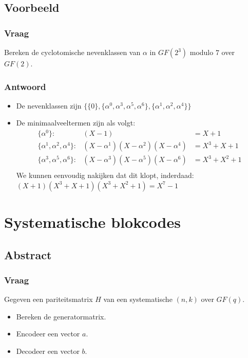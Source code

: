 \documentclass[main.tex]{subfiles}
\begin{document}
\subsection*{Voorbeeld}
\subsubsection*{Vraag}
Bereken de cyclotomische nevenklassen van $\alpha$ in $GF(2^{3})$ modulo $7$ over $GF(2)$.
\subsubsection*{Antwoord}
\begin{itemize}
\item De nevenklassen zijn $\{ \{0\}, \{\alpha^{0}, \alpha^{3}, \alpha^{5}, \alpha^{6}\}, \{\alpha^{1}, \alpha^{2}, \alpha^{4} \} \}$
\item De minimaalveeltermen zijn als volgt:
  \[
  \begin{array}{rll}
    \{\alpha^{0}\} :& (X-1) &= X+1\\
    \{\alpha^{1}, \alpha^{2}, \alpha^{4} \} :& (X-\alpha^{1})(X-\alpha^{2})(X-\alpha^{4}) &= X^{3}+X+1\\
    \{\alpha^{3}, \alpha^{5}, \alpha^{6} \} :& (X-\alpha^{3})(X-\alpha^{5})(X-\alpha^{6}) &= X^3+X^2+1\\
  \end{array}
  \]
  We kunnen eenvoudig nakijken dat dit klopt, inderdaad: $(X+1)(X^{3}+X+1)(X^3+X^2+1) = X^{7}-1$
\end{itemize}


\newpage
\section{Systematische blokcodes}
\subsection*{Abstract}
\subsubsection*{Vraag}
Gegeven een pariteitsmatrix $H$ van een systematische $(n,k)$ over $GF(q)$.
\begin{itemize}
\item Bereken de generatormatrix.
\item Encodeer een vector $a$.
\item Decodeer een vector $b$.
\end{itemize}
\end{document}
